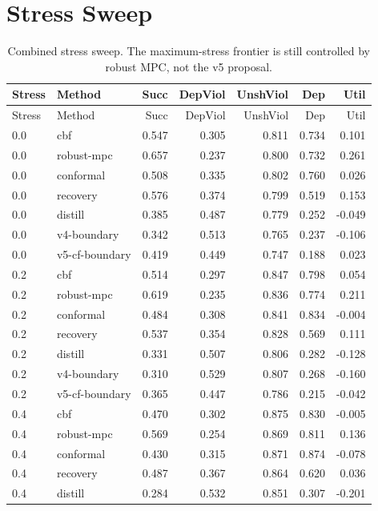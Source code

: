 \documentclass{article}
\begin{document}
\section{Stress Sweep}

\begingroup
\scriptsize
\begin{longtable}{@{}llrrrrr@{}}
\caption{Combined stress sweep. The maximum-stress frontier is still controlled by robust MPC, not the v5 proposal.}\\
\toprule
Stress & Method & Succ & DepViol & UnshViol & Dep & Util \\
\midrule
\endfirsthead
\toprule
Stress & Method & Succ & DepViol & UnshViol & Dep & Util \\
\midrule
\endhead
0.0 & cbf & 0.547 & 0.305 & 0.811 & 0.734 & 0.101 \\
0.0 & robust-mpc & 0.657 & 0.237 & 0.800 & 0.732 & 0.261 \\
0.0 & conformal & 0.508 & 0.335 & 0.802 & 0.760 & 0.026 \\
0.0 & recovery & 0.576 & 0.374 & 0.799 & 0.519 & 0.153 \\
0.0 & distill & 0.385 & 0.487 & 0.779 & 0.252 & -0.049 \\
0.0 & v4-boundary & 0.342 & 0.513 & 0.765 & 0.237 & -0.106 \\
0.0 & v5-cf-boundary & 0.419 & 0.449 & 0.747 & 0.188 & 0.023 \\
0.2 & cbf & 0.514 & 0.297 & 0.847 & 0.798 & 0.054 \\
0.2 & robust-mpc & 0.619 & 0.235 & 0.836 & 0.774 & 0.211 \\
0.2 & conformal & 0.484 & 0.308 & 0.841 & 0.834 & -0.004 \\
0.2 & recovery & 0.537 & 0.354 & 0.828 & 0.569 & 0.111 \\
0.2 & distill & 0.331 & 0.507 & 0.806 & 0.282 & -0.128 \\
0.2 & v4-boundary & 0.310 & 0.529 & 0.807 & 0.268 & -0.160 \\
0.2 & v5-cf-boundary & 0.365 & 0.447 & 0.786 & 0.215 & -0.042 \\
0.4 & cbf & 0.470 & 0.302 & 0.875 & 0.830 & -0.005 \\
0.4 & robust-mpc & 0.569 & 0.254 & 0.869 & 0.811 & 0.136 \\
0.4 & conformal & 0.430 & 0.315 & 0.871 & 0.874 & -0.078 \\
0.4 & recovery & 0.487 & 0.367 & 0.864 & 0.620 & 0.036 \\
0.4 & distill & 0.284 & 0.532 & 0.851 & 0.307 & -0.201 \\

\end{longtable}
\end{document}
